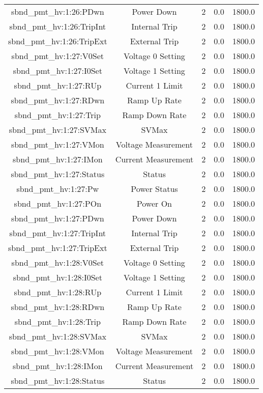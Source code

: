 \begin{center}
\begin{longtable}{c | c c c c }
sbnd\_pmt\_hv:1:26:PDwn & Power Down & 2 & 0.0 & 1800.0\\ 
sbnd\_pmt\_hv:1:26:TripInt & Internal Trip & 2 & 0.0 & 1800.0\\ 
sbnd\_pmt\_hv:1:26:TripExt & External Trip & 2 & 0.0 & 1800.0\\ 
sbnd\_pmt\_hv:1:27:V0Set & Voltage 0 Setting & 2 & 0.0 & 1800.0\\ 
sbnd\_pmt\_hv:1:27:I0Set & Voltage 1 Setting & 2 & 0.0 & 1800.0\\ 
sbnd\_pmt\_hv:1:27:RUp & Current 1 Limit & 2 & 0.0 & 1800.0\\ 
sbnd\_pmt\_hv:1:27:RDwn & Ramp Up Rate & 2 & 0.0 & 1800.0\\ 
sbnd\_pmt\_hv:1:27:Trip & Ramp Down Rate & 2 & 0.0 & 1800.0\\ 
sbnd\_pmt\_hv:1:27:SVMax & SVMax & 2 & 0.0 & 1800.0\\ 
sbnd\_pmt\_hv:1:27:VMon & Voltage Measurement & 2 & 0.0 & 1800.0\\ 
sbnd\_pmt\_hv:1:27:IMon & Current Measurement & 2 & 0.0 & 1800.0\\ 
sbnd\_pmt\_hv:1:27:Status & Status & 2 & 0.0 & 1800.0\\ 
sbnd\_pmt\_hv:1:27:Pw & Power Status & 2 & 0.0 & 1800.0\\ 
sbnd\_pmt\_hv:1:27:POn & Power On & 2 & 0.0 & 1800.0\\ 
sbnd\_pmt\_hv:1:27:PDwn & Power Down & 2 & 0.0 & 1800.0\\ 
sbnd\_pmt\_hv:1:27:TripInt & Internal Trip & 2 & 0.0 & 1800.0\\ 
sbnd\_pmt\_hv:1:27:TripExt & External Trip & 2 & 0.0 & 1800.0\\ 
sbnd\_pmt\_hv:1:28:V0Set & Voltage 0 Setting & 2 & 0.0 & 1800.0\\ 
sbnd\_pmt\_hv:1:28:I0Set & Voltage 1 Setting & 2 & 0.0 & 1800.0\\ 
sbnd\_pmt\_hv:1:28:RUp & Current 1 Limit & 2 & 0.0 & 1800.0\\ 
sbnd\_pmt\_hv:1:28:RDwn & Ramp Up Rate & 2 & 0.0 & 1800.0\\ 
sbnd\_pmt\_hv:1:28:Trip & Ramp Down Rate & 2 & 0.0 & 1800.0\\ 
sbnd\_pmt\_hv:1:28:SVMax & SVMax & 2 & 0.0 & 1800.0\\ 
sbnd\_pmt\_hv:1:28:VMon & Voltage Measurement & 2 & 0.0 & 1800.0\\ 
sbnd\_pmt\_hv:1:28:IMon & Current Measurement & 2 & 0.0 & 1800.0\\ 
sbnd\_pmt\_hv:1:28:Status & Status & 2 & 0.0 & 1800.0\\ 

\end{longtable}
\end{center}
